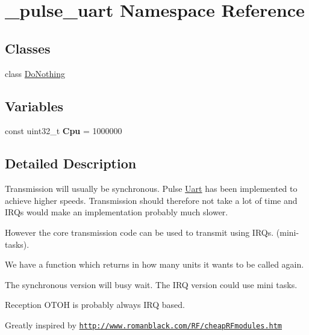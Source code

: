 \hypertarget{namespace__pulse__uart}{}\section{\+\_\+pulse\+\_\+uart Namespace Reference}
\label{namespace__pulse__uart}
\subsection*{Classes}
\begin{DoxyCompactItemize}
\item 
class \hyperlink{class__pulse__uart_1_1DoNothing}{Do\+Nothing}
\end{DoxyCompactItemize}
\subsection*{Variables}
\begin{DoxyCompactItemize}
\item 
\hypertarget{namespace__pulse__uart_a54a3816b5d606db8b8ca8bcb568eeb85}{}\label{namespace__pulse__uart_a54a3816b5d606db8b8ca8bcb568eeb85} 
const uint32\+\_\+t {\bfseries Cpu} = 1000000
\end{DoxyCompactItemize}


\subsection{Detailed Description}
Transmission will usually be synchronous. Pulse \hyperlink{classUart}{Uart} has been implemented to achieve higher speeds. Transmission should therefore not take a lot of time and I\+R\+Qs would make an implementation probably much slower.

However the core transmission code can be used to transmit using I\+R\+Qs. (mini-\/tasks).

We have a function which returns in how many units it wants to be called again.

The synchronous version will busy wait. The I\+RQ version could use mini tasks.

Reception O\+T\+OH is probably always I\+RQ based.

Greatly inspired by \href{http://www.romanblack.com/RF/cheapRFmodules.htm}{\tt http\+://www.\+romanblack.\+com/\+R\+F/cheap\+R\+Fmodules.\+htm} 